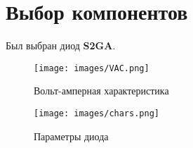 \chapter{Выбор компонентов}

    Был выбран диод \textbf{S2GA}.

\begin{figure}
	\centering
	\caption{Вольт-амперная характеристика}
	\texttt{[image: images/VAC.png]}
\end{figure}

\begin{figure}
	\centering
	\caption{Параметры диода}
	\texttt{[image: images/chars.png]}
\end{figure}
